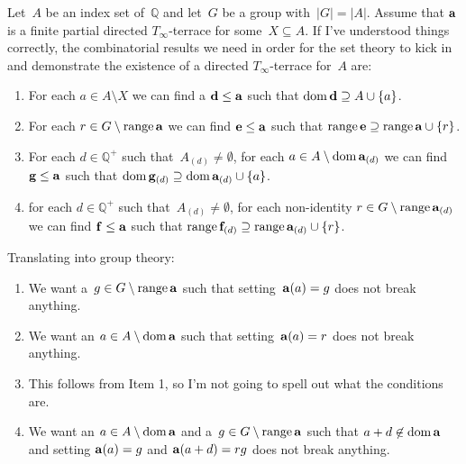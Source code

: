\documentclass[a4paper,12pt]{article}
\newcommand{\Q}{\mathbb{Q}}
\newcommand{\dom}{\mathop{\rm dom}\nolimits}
\newcommand{\range}{\mathop{\rm range}\nolimits}
\begin{document}
Let~$A$ be an index set of~$\Q$ and let~$G$ be a group with~$|G| = |A|$.  Assume that ${\bf a}$ is a finite partial directed $T_{\infty}$-terrace for some~$X \subseteq A$.  If I've understood things correctly, the combinatorial results we need in order for the set theory to kick in and demonstrate the existence of a directed $T_{\infty}$-terrace for~$A$ are:
\begin{enumerate}

\item For each $a \in A \setminus X$ we can find a ${\bf d} \leq {\bf a}$ such that $\dom{{\bf d}} \supseteq A \cup \{ a \}$.

\item For each $r \in G \setminus \range{{\bf a}}$ we can find ${\bf e} \leq {\bf a}$  such that  $\range{{\bf e}} \supseteq \range{{\bf a}} \cup \{ r \}$.

\item For each $d \in \Q^+$ such that~$A_{(d)} \neq \emptyset$, for each $a \in A \setminus \dom{{\bf a}_{(d)}}$ we can find ${\bf g} \leq {\bf a}$ such that $\dom{{\bf g}_{(d)}} \supseteq \dom{{\bf a}_{(d)}} \cup \{ a \}$.

\item for each $d \in \Q^+$ such that~$A_{(d)} \neq \emptyset$, for each non-identity $r \in G \setminus \range{{\bf a}_{(d)}}$ we can find ${\bf f} \leq {\bf a}$ such that $\range{{\bf f}_{(d)}} \supseteq \range{{\bf a}_{(d)}} \cup \{ r \}$.

\end{enumerate}

Translating into group theory:
\begin{enumerate}

\item We want a~$g \in G \setminus \range{{\bf a}}$ such that setting~${\bf a}(a) = g$ does not break anything.
  
\item  We want an $a \in A \setminus \dom{{\bf a}}$ such that setting~${\bf a}(a) = r$ does not break anything.

\item This follows from Item 1, so I'm not going to spell out what the conditions are.

\item  We want an $a \in A \setminus \dom{{\bf a}}$ and a~$g \in G \setminus \range{{\bf a}}$ such that $a+ d \not\in \dom{{\bf a}}$ and setting ${\bf a}(a) = g$ and ${\bf a}(a+d) = rg$ does not break anything.


\end{enumerate}
\end{document}
